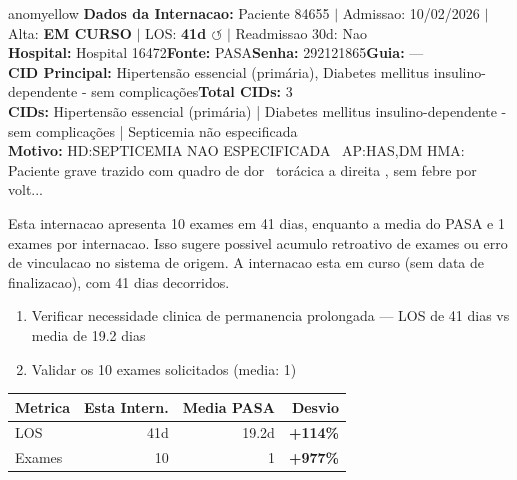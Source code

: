 \documentclass[a4paper,10pt]{article}
\begin{document}
\begin{anomalycard}[Internacao 183121 | PASA | MODERADO (z=2.92)]{anomyellow}
\textbf{Dados da Internacao:} Paciente 84655 $\mid$ Admissao: 10/02/2026 $\mid$ Alta: \textcolor{anomorange}{\textbf{EM CURSO}} $\mid$ LOS: \textbf{41d \textcolor{anomorange}{$\circlearrowleft$}} $\mid$ Readmissao 30d: Nao\\
\textbf{Hospital:} Hospital 16472\quad\textbf{Fonte:} PASA\quad\textbf{Senha:} 292121865\quad\textbf{Guia:} ---\\
\textbf{CID Principal:} {\small Hipertensão essencial (primária), Diabetes mellitus insulino-dependente - sem complicações}\quad\textbf{Total CIDs:} 3\\

\textbf{CIDs:} {\scriptsize Hipertensão essencial (primária) | Diabetes mellitus insulino-dependente - sem complicações | Septicemia não especificada}\\

\textbf{Motivo:} {\scriptsize HD:SEPTICEMIA NAO ESPECIFICADA  AP:HAS,DM HMA: Paciente grave trazido com quadro de dor  torácica a direita , sem febre por volt...}\\

\vspace{2pt}\begin{tcolorbox}[colback=severityred!20,colframe=anomyellow,title={\textbf{Interpretacao de Negocio}},fonttitle=\bfseries\small,left=4pt,right=4pt,top=3pt,bottom=3pt]
{\small Esta internacao apresenta 10 exames em 41 dias, enquanto a media do PASA e 1 exames por internacao. Isso sugere possivel acumulo retroativo de exames ou erro de vinculacao no sistema de origem. A internacao esta em curso (sem data de finalizacao), com 41 dias decorridos.}
\end{tcolorbox}
\begin{tcolorbox}[colback=severityyellow!30,colframe=anomorange,title={\textbf{Recomendacoes Especificas}},fonttitle=\bfseries\small,left=4pt,right=4pt,top=3pt,bottom=3pt]
\begin{enumerate}[nosep,leftmargin=16pt]
\item {\small Verificar necessidade clinica de permanencia prolongada --- LOS de 41 dias vs media de 19.2 dias}
\item {\small Validar os 10 exames solicitados (media: 1)}
\end{enumerate}
\end{tcolorbox}
\begin{center}\begin{tabular}{l r r r}\toprule\textbf{Metrica} & \textbf{Esta Intern.} & \textbf{Media PASA} & \textbf{Desvio} \\\midrule
LOS & 41d & 19.2d & \textcolor{anomred}{\textbf{+114\%}} \\
Exames & 10 & 1 & \textcolor{anomred}{\textbf{+977\%}} \\
\bottomrule\end{tabular}\end{center}


\end{anomalycard}
\end{document}
